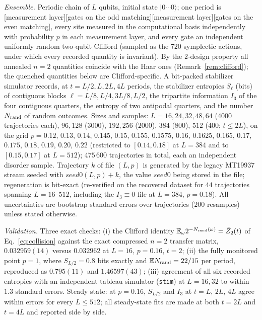 \documentclass[aps,prx,reprint,superscriptaddress,nobibnotes,longbibliography]{revtex4-2}
\theoremstyle{remark}
\newcommand{\E}{\mathbb E}
\begin{document}
\emph{Ensemble.}  Periodic chain of $L$ qubits, initial state $|0\cdots0\rangle$; one period is [measurement layer][gates on the odd matching][measurement layer][gates on the even matching], every site measured in the computational basis independently with probability $p$ in each measurement layer, and every gate an independent uniformly random two-qubit Clifford (sampled as the $720$ symplectic actions, under which every recorded quantity is invariant).  By the $2$-design property all annealed $n=2$ quantities coincide with the Haar ones (Remark~\ref{rem:clifford}); the quenched quantities below are Clifford-specific.  A bit-packed stabilizer simulator records, at $t=L/2,L,2L,4L$ periods, the stabilizer entropies $S_\ell$ (bits) of contiguous blocks $\ell=L/8,L/4,3L/8,L/2$, the tripartite information $I_3$ of the four contiguous quarters, the entropy of two antipodal quarters, and the number $N_{\rm rand}$ of random outcomes.  Sizes and samples: $L=16,24,32,48,64$ ($4000$ trajectories each), $96,128$ ($3000$), $192,256$ ($2000$), $384$ ($800$), $512$ ($400$; $t\le2L$), on the grid $p=0.12$, $0.13$, $0.14$, $0.145$, $0.15$, $0.155$, $0.1575$, $0.16$, $0.1625$, $0.165$, $0.17$, $0.175$, $0.18$, $0.19$, $0.20$, $0.22$ (restricted to $[0.14,0.18]$ at $L=384$ and to $[0.15,0.17]$ at $L=512$); $475\,600$ trajectories in total, each an independent disorder sample.  Trajectory $k$ of file $(L,p)$ is generated by the legacy MT19937 stream seeded with $\mathit{seed0}(L,p)+k$, the value $\mathit{seed0}$ being stored in the file; regeneration is bit-exact (re-verified on the recovered dataset for $44$ trajectories spanning $L=16$--$512$, including the $I_3\equiv0$ file at $L=384$, $p=0.18$).  All uncertainties are bootstrap standard errors over trajectories ($200$ resamples) unless stated otherwise.

\emph{Validation.}  Three exact checks: (i) the Clifford identity $\E_\omega2^{-N_{\rm rand}(\omega)}=\bar Z_2(t)$ of Eq.~\eqref{eq:collision} against the exact compressed $n=2$ transfer matrix, $0.032959(14)$ versus $0.032962$ at $L=16$, $p=0.16$, $t=2$; (ii) the fully monitored point $p=1$, where $S_{L/2}=0.8$ bits exactly and $\E N_{\rm rand}=22/15$ per period, reproduced as $0.795(11)$ and $1.46597(43)$; (iii) agreement of all six recorded entropies with an independent tableau simulator (\texttt{stim}) at $L=16,32$ to within $1.3$ standard errors.  Steady state: at $p=0.16$, $S_{L/2}$ and $I_3$ at $t=L$, $2L$, $4L$ agree within errors for every $L\le512$; all steady-state fits are made at both $t=2L$ and $t=4L$ and reported side by side.
\end{document}
